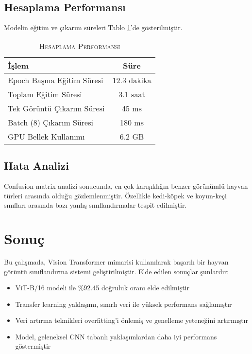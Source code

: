 \documentclass[conference, a4paper]{IEEEtran}
\begin{document}
	\subsection{Hesaplama Performansı}
	
	Modelin eğitim ve çıkarım süreleri Tablo \ref{tablo_timing}'de gösterilmiştir.
	
	\begin{table}[h]
		\centering
		\caption{\textsc{Hesaplama Performansı}}
		\label{tablo_timing}
		\begin{tabular}{|l|c|}
			\hline
			\textbf{İşlem} & \textbf{Süre} \\
			\hline
			Epoch Başına Eğitim Süresi & 12.3 dakika \\
			\hline
			Toplam Eğitim Süresi & 3.1 saat \\
			\hline
			Tek Görüntü Çıkarım Süresi & 45 ms \\
			\hline
			Batch (8) Çıkarım Süresi & 180 ms \\
			\hline
			GPU Bellek Kullanımı & 6.2 GB \\
			\hline
		\end{tabular}
	\end{table}
	
	\subsection{Hata Analizi}
	
	Confusion matrix analizi sonucunda, en çok karışıklığın benzer görünümlü hayvan türleri arasında olduğu gözlemlenmiştir. Özellikle kedi-köpek ve koyun-keçi sınıfları arasında bazı yanlış sınıflandırmalar tespit edilmiştir.
	
	\section{Sonuç}
	
	Bu çalışmada, Vision Transformer mimarisi kullanılarak başarılı bir hayvan görüntü sınıflandırma sistemi geliştirilmiştir. Elde edilen sonuçlar şunlardır:
	
	\begin{itemize}
		\item ViT-B/16 modeli ile \%92.45 doğruluk oranı elde edilmiştir
		\item Transfer learning yaklaşımı, sınırlı veri ile yüksek performans sağlamıştır
		\item Veri artırma teknikleri overfitting'i önlemiş ve genelleme yeteneğini artırmıştır
		\item Model, geleneksel CNN tabanlı yaklaşımlardan daha iyi performans göstermiştir
	\end{itemize}
	
\end{document}
